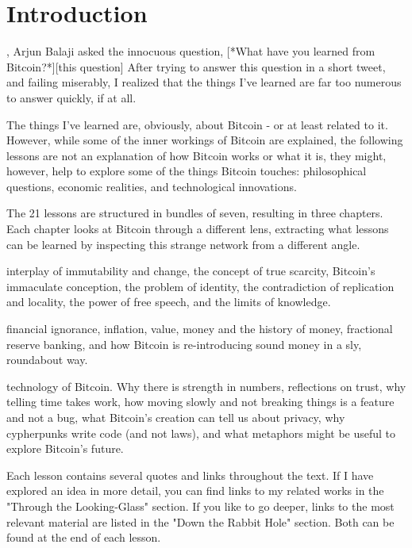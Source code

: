 \chapter{Introduction}
\label{ch:introduction}

, Arjun Balaji asked the innocuous question, [*What have you
learned from Bitcoin?*][this question] After trying to answer this question in a
short tweet, and failing miserably, I realized that the things I've learned are
far too numerous to answer quickly, if at all.

The things I've learned are, obviously, about Bitcoin - or at least related to
it. However, while some of the inner workings of Bitcoin are explained, the
following lessons are not an explanation of how Bitcoin works or what it is,
they might, however, help to explore some of the things Bitcoin touches:
philosophical questions, economic realities, and technological innovations.

The 21 lessons are structured in bundles of seven, resulting in three chapters.
Each chapter looks at Bitcoin through a different lens, extracting what
lessons can be learned by inspecting this strange network from a different
angle.

interplay of immutability and change, the concept of true scarcity, Bitcoin's
immaculate conception, the problem of identity, the contradiction of replication
and locality, the power of free speech, and the limits of knowledge.

financial ignorance, inflation, value, money and the history of money,
fractional reserve banking, and how Bitcoin is re-introducing sound money in a
sly, roundabout way.

technology of Bitcoin.  Why there is strength in numbers, reflections on trust,
why telling time takes work, how moving slowly and not breaking things is a
feature and not a bug, what Bitcoin's creation can tell us about privacy, why
cypherpunks write code (and not laws), and what metaphors might be useful to
explore Bitcoin's future.

Each lesson contains several quotes and links throughout the text. If I have
explored an idea in more detail, you can find links to my related works in the
"Through the Looking-Glass" section. If you like to go deeper, links to the most
relevant material are listed in the "Down the Rabbit Hole" section. Both can be
found at the end of each lesson.

